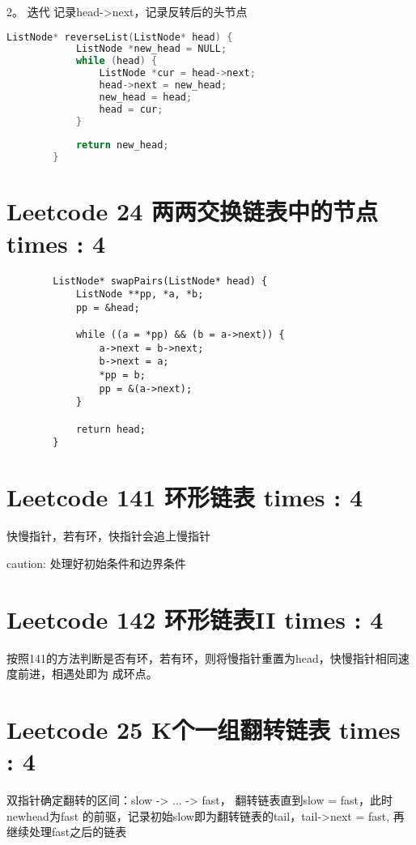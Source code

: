 \documentclass[UTF8]{ctexart}
\begin{document}
2。 迭代 记录head->next，记录反转后的头节点
\begin{framed}
	\begin{lstlisting}[language=C++]
		ListNode* reverseList(ListNode* head) {
			ListNode *new_head = NULL;
			while (head) {
				ListNode *cur = head->next;
				head->next = new_head;
				new_head = head;
				head = cur;
			}
	
			return new_head;
		}
	\end{lstlisting}
\end{framed}

\section{Leetcode 24 两两交换链表中的节点 times : 4} 
\begin{framed}
	\begin{lstlisting}
		ListNode* swapPairs(ListNode* head) {
			ListNode **pp, *a, *b;
			pp = &head;

			while ((a = *pp) && (b = a->next)) {
				a->next = b->next;
				b->next = a;
				*pp = b;
				pp = &(a->next);
			}

			return head;
		}
	\end{lstlisting}
\end{framed}

\section{Leetcode 141 环形链表 times : 4}
快慢指针，若有环，快指针会追上慢指针

caution: 处理好初始条件和边界条件

\section{Leetcode 142 环形链表II times : 4}
按照141的方法判断是否有环，若有环，则将慢指针重置为head，快慢指针相同速度前进，相遇处即为
成环点。

\section{Leetcode 25 K个一组翻转链表 times : 4}
双指针确定翻转的区间：slow -> ...  -> fast， 翻转链表直到slow = fast，此时newhead为fast
的前驱，记录初始slow即为翻转链表的tail，tail->next = fast, 再继续处理fast之后的链表
\end{document}
